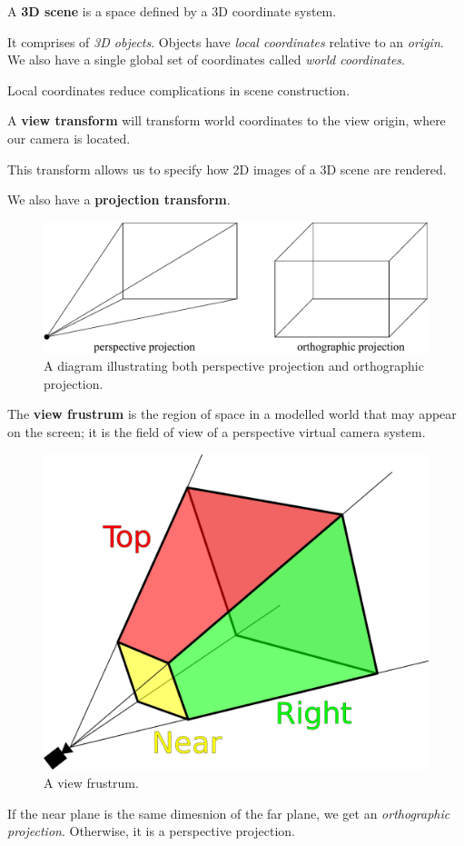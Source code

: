 \begin{definition}[3D scene]
    A \textbf{3D scene} is a space defined by a 3D coordinate system.
\end{definition}

It comprises of \emph{3D objects}.
Objects have \emph{local coordinates} relative to an \emph{origin}.
We also have a single global set of coordinates called \emph{world coordinates}.

Local coordinates reduce complications in scene construction.

\begin{definition}
    A \textbf{view transform} will transform world coordinates to the
    view origin, where our camera is located.
\end{definition}

This transform allows us to specify how 2D images of a 3D scene are rendered.

We also have a \textbf{projection transform}.

\begin{figure}[]
    \centering
    \includegraphics[width=0.8\linewidth]{images/perspective-orthographic-projection.pdf}
    \caption{A diagram illustrating both perspective projection and
             orthographic projection.
    }%
    \label{fig:perspective-orthographic-projection}
\end{figure}

\begin{definition}
    The \textbf{view frustrum} is the region of space in a modelled world
    that may appear on the screen;
    it is the field of view of a perspective virtual camera system.
\end{definition}

\begin{figure}[]
    \centering
    \includegraphics[width=0.8\linewidth]{images/view-frustrum.png}
    \caption{A view frustrum.}%
    \label{fig:view-frustrum}
\end{figure}

If the near plane is the same dimesnion of the far plane, we get an 
\emph{orthographic projection}. 
Otherwise, it is a perspective projection.
